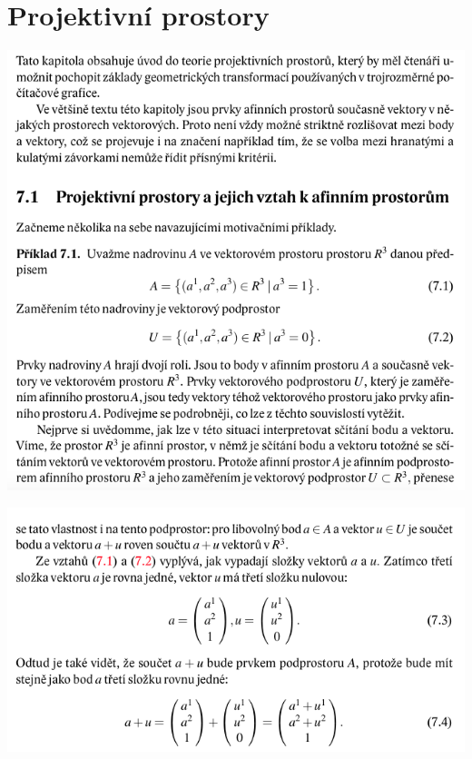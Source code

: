 \documentclass[12pt,a4paper]{article}
\begin{document}
\section{Projektivní prostory}
\begin{center}
	\includegraphics[scale=0.6]{img/ProjektivniProstor1}
\end{center}
\begin{center}
	\includegraphics[scale=0.6]{img/ProjektivniProstor2}
\end{center}
\end{document}

